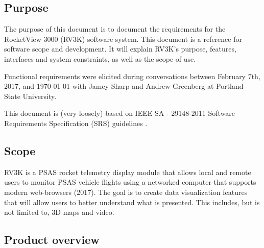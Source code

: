\subsection{Purpose}
  The purpose of this document is to document the
  requirements for the RocketView 3000 (RV3K) \vers software system. This
  document is a reference for software scope and development. It will explain
  RV3K’s purpose, features, interfaces and system constraints, as well as the 
  scope of use.

  Functional requirements were elicited during conversations between February 7th,
  2017, and \today{} with Jamey Sharp and Andrew Greenberg at Portland State
  University. \cite{Interview}

  This document is (very loosely) based on IEEE SA - 29148-2011 Software
  Requirements Specification (SRS) guidelines \cite{ieee}.

\subsection{Scope}
  RV3K \vers is a PSAS rocket telemetry display module that allows local and
  remote users to monitor PSAS vehicle flights using a networked computer 
  that supports modern web-browsers (2017). The goal is to create data 
  visualization features that will allow users to better understand what is
  presented. This includes, but is not limited to, 3D maps and video.

\subsection{Product overview}

